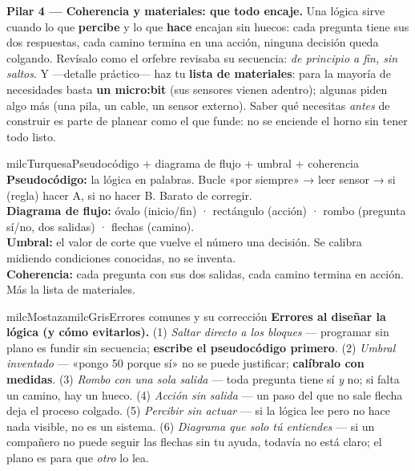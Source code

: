 \documentclass[11pt,letterpaper]{article}
\newcommand{\milcpaso}[3]{%
\Needspace{4\baselineskip}%
\begin{tcolorbox}[enhanced,colback=white,colframe=milcLinea,arc=1.5mm,boxrule=.9pt,
  left=14mm,right=4mm,top=3mm,bottom=3mm,before skip=4pt,after skip=4pt,
  fontupper=\RaggedRight,
  overlay={\node[anchor=north west,circle,fill=#2,text=white,inner sep=0pt,
    minimum size=7.4mm,font=\sffamily\bfseries\small]
    at ([xshift=3.6mm,yshift=-3.2mm]frame.north west) {#1};}]
#3
\end{tcolorbox}}
\begin{document}
\milcpaso{4}{milcTurquesa}{\textbf{Pilar 4 --- Coherencia y materiales: que todo encaje.} Una lógica sirve cuando lo que \textbf{percibe} y lo que \textbf{hace} encajan sin huecos: cada pregunta tiene sus dos respuestas, cada camino termina en una acción, ninguna decisión queda colgando. Revísalo como el orfebre revisaba su secuencia: \emph{de principio a fin, sin saltos}. Y ---detalle práctico--- haz tu \textbf{lista de materiales}: para la mayoría de necesidades basta \textbf{un micro:bit} (sus sensores vienen adentro); algunas piden algo más (una pila, un cable, un sensor externo). Saber qué necesitas \emph{antes} de construir es parte de planear como el que funde: no se enciende el horno sin tener todo listo.}

\begin{drawbox}{milcTurquesa}{Pseudocódigo + diagrama de flujo + umbral + coherencia}
\textbf{Pseudocódigo:} la lógica en palabras. Bucle «por siempre» → leer sensor → si (regla) hacer A, si no hacer B. Barato de corregir. \\[1mm]
\textbf{Diagrama de flujo:} óvalo (inicio/fin) · rectángulo (acción) · rombo (pregunta sí/no, dos salidas) · flechas (camino). \\[1mm]
\textbf{Umbral:} el valor de corte que vuelve el número una decisión. Se calibra midiendo condiciones conocidas, no se inventa. \\[1mm]
\textbf{Coherencia:} cada pregunta con sus dos salidas, cada camino termina en acción. Más la lista de materiales.
\end{drawbox}

\begin{softbox}{milcMostaza}{milcGris}{Errores comunes y su corrección}
\textbf{Errores al diseñar la lógica (y cómo evitarlos).} (1) \emph{Saltar directo a los bloques} --- programar sin plano es fundir sin secuencia; \textbf{escribe el pseudocódigo primero}. (2) \emph{Umbral inventado} --- «pongo 50 porque sí» no se puede justificar; \textbf{calíbralo con medidas}. (3) \emph{Rombo con una sola salida} --- toda pregunta tiene sí \emph{y} no; si falta un camino, hay un hueco. (4) \emph{Acción sin salida} --- un paso del que no sale flecha deja el proceso colgado. (5) \emph{Percibir sin actuar} --- si la lógica lee pero no hace nada visible, no es un sistema. (6) \emph{Diagrama que solo tú entiendes} --- si un compañero no puede seguir las flechas sin tu ayuda, todavía no está claro; el plano es para que \emph{otro} lo lea.
\end{softbox}
\end{document}
